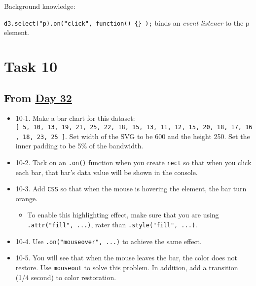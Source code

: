 \documentclass[
]{book}
\providecommand{\tightlist}{%
  \setlength{\itemsep}{0pt}\setlength{\parskip}{0pt}}
\begin{document}
Background knowledge:

\texttt{d3.select("p).on("click",\ function()\ \{\}\ );} binds an \emph{event listener} to the p element.

\hypertarget{task-10}{%
\section{Task 10}\label{task-10}}

\hypertarget{from-day-32}{%
\subsection{\texorpdfstring{From \href{https://observablehq.com/@hongtaoh/day-32-2020-09-25}{Day 32}}{From Day 32}}\label{from-day-32}}

\begin{itemize}
\item
  10-1. Make a bar chart for this dataset: \texttt{{[}\ 5,\ 10,\ 13,\ 19,\ 21,\ 25,\ 22,\ 18,\ 15,\ 13,\ 11,\ 12,\ 15,\ 20,\ 18,\ 17,\ 16,\ 18,\ 23,\ 25\ {]}}. Set width of the SVG to be 600 and the height 250. Set the inner padding to be 5\% of the bandwidth.
\item
  10-2. Tack on an \texttt{.on()} function when you create \texttt{rect} so that when you click each bar, that bar's data value will be shown in the console.
\item
  10-3. Add \texttt{CSS} so that when the mouse is hovering the element, the bar turn orange.

  \begin{itemize}
  \tightlist
  \item
    To enable this highlighting effect, make sure that you are using \texttt{.attr("fill",\ ...)}, rater than \texttt{.style("fill",\ ...)}.
  \end{itemize}
\item
  10-4. Use \texttt{.on("mouseover",\ ...)} to achieve the same effect.
\item
  10-5. You will see that when the mouse leaves the bar, the color does not restore. Use \texttt{mouseout} to solve this problem. In addition, add a transition (1/4 second) to color restoration.


\end{itemize}
\end{document}
